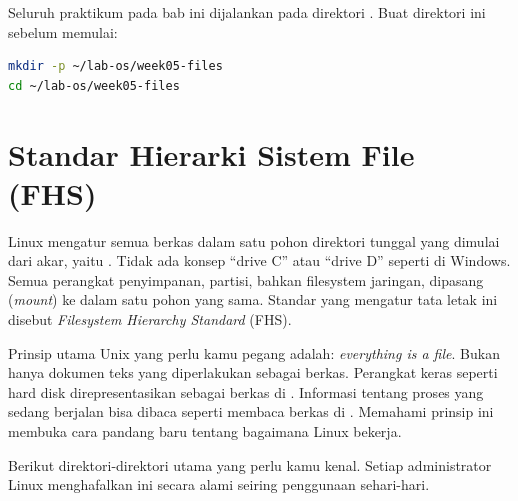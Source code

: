 \begin{notebox}
Seluruh praktikum pada bab ini dijalankan pada direktori .
Buat direktori ini sebelum memulai:
\begin{lstlisting}[language=bash]
mkdir -p ~/lab-os/week05-files
cd ~/lab-os/week05-files
\end{lstlisting}
\end{notebox}

\section{Standar Hierarki Sistem File (FHS)}
\label{sec:fhs}

Linux mengatur semua berkas dalam satu pohon direktori tunggal yang dimulai dari akar,
yaitu \dir{/}. Tidak ada konsep ``drive C'' atau ``drive D'' seperti di Windows. Semua
perangkat penyimpanan, partisi, bahkan filesystem jaringan, dipasang (\textit{mount}) ke
dalam satu pohon yang sama. Standar yang mengatur tata letak ini disebut
\textit{Filesystem Hierarchy Standard} (FHS).

Prinsip utama Unix yang perlu kamu pegang adalah: \textit{everything is a file}. Bukan
hanya dokumen teks yang diperlakukan sebagai berkas. Perangkat keras seperti hard disk
direpresentasikan sebagai berkas di . Informasi tentang proses yang sedang
berjalan bisa dibaca seperti membaca berkas di . Memahami prinsip ini membuka
cara pandang baru tentang bagaimana Linux bekerja.

Berikut direktori-direktori utama yang perlu kamu kenal. Setiap administrator Linux
menghafalkan ini secara alami seiring penggunaan sehari-hari.

